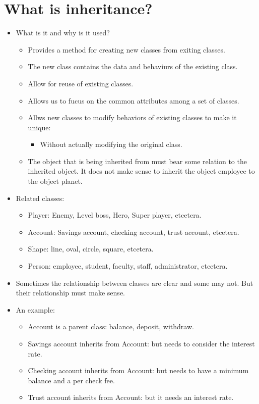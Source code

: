 \section{What is inheritance?}
\begin{itemize}
    \item What is it and why is it used?
        \begin{itemize}
            \item Provides a method for creating new classes from exiting classes.
            \item The new class contains the data and behaviurs of the existing class.
            \item Allow for reuse of existing classes.
            \item Allows us to fucus on the common attributes among a set of classes.
            \item Allws new classes to modify behaviors of existing classes to make it unique:
                \begin{itemize}
                    \item Without actually modifying the original class.
                \end{itemize}
            
            \item The object that is being inherited from must bear some relation to the inherited object. It does not make sense to inherit the object employee to the object planet. 
        \end{itemize}
    
    \item Related classes:
        \begin{itemize}
            \item Player: Enemy, Level boss, Hero, Super player, etcetera.
            \item Account: Savings account, checking account, trust account, etcetera.
            \item Shape: line, oval, circle, square, etcetera.
            \item Person: employee, student, faculty, staff, administrator, etcetera.
        \end{itemize}
    
    \item Sometimes the relationship between classes are clear and some may not. But their relationship must make sense.
    \item An example:
        \begin{itemize}
            \item Account is a parent class: balance, deposit, withdraw.
            \item Savings account inherits from Account: but needs to consider the interest rate.
            \item Checking account inherits from Account: but needs to have a minimum balance and a per check fee.
            \item Trust account inherits from Account: but it needs an interest rate.
        \end{itemize}
    

\end{itemize}
